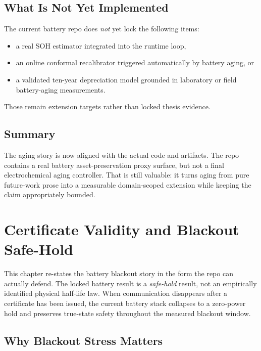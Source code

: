 \subsection{What Is Not Yet Implemented}

The current battery repo does \emph{not} yet lock the following items:

\begin{itemize}
  \item a real SOH estimator integrated into the runtime loop,
  \item an online conformal recalibrator triggered automatically by battery
    aging, or
  \item a validated ten-year depreciation model grounded in laboratory or
    field battery-aging measurements.
\end{itemize}

Those remain extension targets rather than locked thesis evidence.

\subsection{Summary}

The aging story is now aligned with the actual code and artifacts.  The repo
contains a real battery asset-preservation proxy surface, but not a final
electrochemical aging controller.  That is still valuable: it turns aging
from pure future-work prose into a measurable domain-scoped extension while
keeping the claim appropriately bounded.


\section{Certificate Validity and Blackout Safe-Hold}
\label{ch:cert-half-life-blackout}

This chapter re-states the battery blackout story in the form the repo can
actually defend.  The locked battery result is a \emph{safe-hold} result,
not an empirically identified physical half-life law.  When communication
disappears after a certificate has been issued, the current battery stack
collapses to a zero-power hold and preserves true-state safety throughout the
measured blackout window.

\subsection{Why Blackout Stress Matters}

